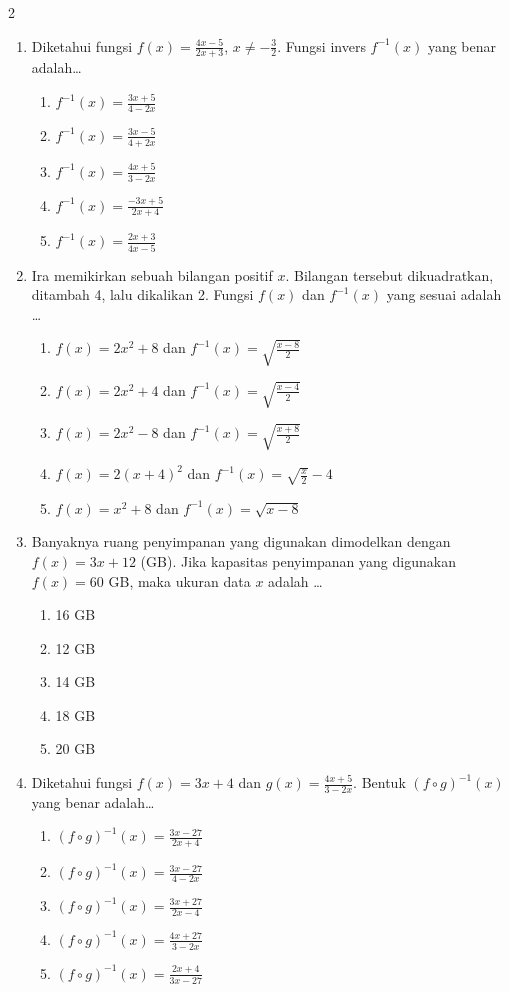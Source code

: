 \documentclass[10pt,a4paper]{article}
\begin{document}
\begin{multicols}{2}
\begin{enumerate}
    \item Diketahui fungsi $f(x)=\frac{4x-5}{2x+3}$, $x\neq -\frac{3}{2}$. Fungsi invers $f^{-1}(x)$ yang benar adalah\dots
    \begin{enumerate}
        \item $f^{-1}(x)=\frac{3x+5}{4-2x}$
        \item $f^{-1}(x)=\frac{3x-5}{4+2x}$
        \item $f^{-1}(x)=\frac{4x+5}{3-2x}$
        \item $f^{-1}(x)=\frac{-3x+5}{2x+4}$
        \item $f^{-1}(x)=\frac{2x+3}{4x-5}$
    \end{enumerate}

    \item Ira memikirkan sebuah bilangan positif $x$. Bilangan tersebut dikuadratkan, ditambah 4, lalu dikalikan 2. Fungsi $f(x)$ dan $f^{-1}(x)$ yang sesuai adalah \dots
    \begin{enumerate}
        \item $f(x)=2x^2+8$ dan $f^{-1}(x)=\sqrt{\frac{x-8}{2}}$
        \item $f(x)=2x^2+4$ dan $f^{-1}(x)=\sqrt{\frac{x-4}{2}}$
        \item $f(x)=2x^2-8$ dan $f^{-1}(x)=\sqrt{\frac{x+8}{2}}$
        \item $f(x)=2(x+4)^2$ dan $f^{-1}(x)=\sqrt{\frac{x}{2}}-4$
        \item $f(x)=x^2+8$ dan $f^{-1}(x)=\sqrt{x-8}$
    \end{enumerate}

    \item Banyaknya ruang penyimpanan yang digunakan dimodelkan dengan $f(x)=3x+12$ (GB). Jika kapasitas penyimpanan yang digunakan $f(x) = 60$ GB, maka ukuran data $x$ adalah \dots
    \begin{enumerate}
        \item 16 GB
        \item 12 GB
        \item 14 GB
        \item 18 GB
        \item 20 GB
    \end{enumerate}

    \item Diketahui fungsi $f(x)=3x+4$ dan $g(x)=\frac{4x+5}{3-2x}$. Bentuk $(f\circ g)^{-1}(x)$ yang benar adalah\dots
    \begin{enumerate}
        \item $(f\circ g)^{-1}(x)=\frac{3x-27}{2x+4}$
        \item $(f\circ g)^{-1}(x)=\frac{3x-27}{4-2x}$
        \item $(f\circ g)^{-1}(x)=\frac{3x+27}{2x-4}$
        \item $(f\circ g)^{-1}(x)=\frac{4x+27}{3-2x}$
        \item $(f\circ g)^{-1}(x)=\frac{2x+4}{3x-27}$
    \end{enumerate}


\end{enumerate}
\end{multicols}
\end{document}
